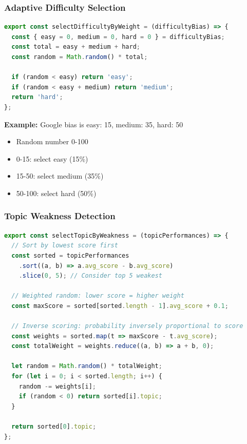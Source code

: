 \documentclass[12pt,a4paper,oneside]{article}
\begin{document}
\subsubsection{Adaptive Difficulty Selection}

\begin{lstlisting}[language=JavaScript, caption=Weighted Random Difficulty Selection]
export const selectDifficultyByWeight = (difficultyBias) => {
  const { easy = 0, medium = 0, hard = 0 } = difficultyBias;
  const total = easy + medium + hard;
  const random = Math.random() * total;

  if (random < easy) return 'easy';
  if (random < easy + medium) return 'medium';
  return 'hard';
};
\end{lstlisting}

\textbf{Example:} Google bias is {easy: 15, medium: 35, hard: 50}

\begin{itemize}
    \item Random number 0-100
    \item 0-15: select easy (15\%)
    \item 15-50: select medium (35\%)
    \item 50-100: select hard (50\%)
\end{itemize}

\subsubsection{Topic Weakness Detection}

\begin{lstlisting}[language=JavaScript, caption=Select Weakest Topic]
export const selectTopicByWeakness = (topicPerformances) => {
  // Sort by lowest score first
  const sorted = topicPerformances
    .sort((a, b) => a.avg_score - b.avg_score)
    .slice(0, 5); // Consider top 5 weakest

  // Weighted random: lower score = higher weight
  const maxScore = sorted[sorted.length - 1].avg_score + 0.1;
  
  // Inverse scoring: probability inversely proportional to score
  const weights = sorted.map(t => maxScore - t.avg_score);
  const totalWeight = weights.reduce((a, b) => a + b, 0);
  
  let random = Math.random() * totalWeight;
  for (let i = 0; i < sorted.length; i++) {
    random -= weights[i];
    if (random < 0) return sorted[i].topic;
  }
  
  return sorted[0].topic;
};
\end{lstlisting}
\end{document}
